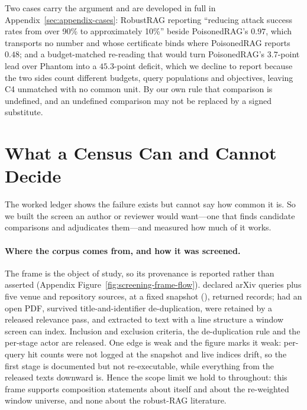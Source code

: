 \documentclass[11pt]{article}
\begin{document}
Two cases carry the argument and are developed in full in
Appendix~\ref{sec:appendix-cases}: RobustRAG reporting ``reducing attack
success rates from over 90\% to approximately 10\%'' beside PoisonedRAG's
$0.97$, which
transports no number and whose certificate binds where PoisonedRAG reports
$0.48$; and a budget-matched re-reading that would turn PoisonedRAG's
$3.7$-point lead over Phantom into a $45.3$-point deficit, which we decline to
report because the two sides count different budgets, query populations and
objectives, leaving C4 unmatched with no common unit. By our own rule that
comparison is undefined, and an undefined comparison may not be replaced by a
signed substitute.

\section{What a Census Can and Cannot Decide}
\label{sec:census}

The worked ledger shows the failure exists but cannot say how common it is. So
we built the screen an author or reviewer would want---one that finds candidate
comparisons and adjudicates them---and measured how much of it works.

\paragraph{Where the corpus comes from, and how it was screened.}
The frame is the object of study, so its provenance is reported rather than
asserted (Appendix Figure~\ref{fig:screening-frame-flow}). \FlowQueries{}
declared arXiv queries plus five venue and repository sources, at a fixed
snapshot (\FlowSnapshot{}), returned \FlowRetrieved{} records; \FlowOpenPDF{}
had an open PDF, \FlowDedup{} survived title-and-identifier de-duplication,
\FlowScreened{} were retained by a released relevance pass, and \FlowTexts{}
extracted to text with a line structure a window screen can index. Inclusion and
exclusion criteria, the de-duplication rule and the per-stage actor are
released. One edge is weak and the figure marks it weak: per-query hit counts
were not logged at the snapshot and live indices drift, so the first stage is
documented but not re-executable, while everything from the \FlowTexts{}
released texts downward is. Hence the scope limit we hold to throughout: this
frame supports composition statements about itself and about the re-weighted
window universe, and none about the robust-RAG literature.
\end{document}
